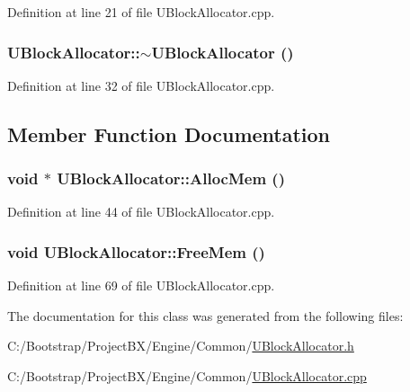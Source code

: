 Definition at line 21 of file UBlockAllocator.cpp.\hypertarget{class_u_block_allocator_572f0a804a5496803aa638168effb723}{
\subsubsection[{$\sim$UBlockAllocator}]{\setlength{\rightskip}{0pt plus 5cm}UBlockAllocator::$\sim$UBlockAllocator ()}}
\label{class_u_block_allocator_572f0a804a5496803aa638168effb723}




Definition at line 32 of file UBlockAllocator.cpp.

\subsection{Member Function Documentation}
\hypertarget{class_u_block_allocator_f8ab7728bc950b0626577cec829e0d4a}{
\subsubsection[{AllocMem}]{\setlength{\rightskip}{0pt plus 5cm}void $\ast$ UBlockAllocator::AllocMem ()}}
\label{class_u_block_allocator_f8ab7728bc950b0626577cec829e0d4a}




Definition at line 44 of file UBlockAllocator.cpp.\hypertarget{class_u_block_allocator_d2d64f33591628e1c5f214cd4f6a31cd}{
\subsubsection[{FreeMem}]{\setlength{\rightskip}{0pt plus 5cm}void UBlockAllocator::FreeMem ()}}
\label{class_u_block_allocator_d2d64f33591628e1c5f214cd4f6a31cd}




Definition at line 69 of file UBlockAllocator.cpp.

The documentation for this class was generated from the following files:\begin{CompactItemize}
\item 
C:/Bootstrap/ProjectBX/Engine/Common/\hyperlink{_u_block_allocator_8h}{UBlockAllocator.h}\item 
C:/Bootstrap/ProjectBX/Engine/Common/\hyperlink{_u_block_allocator_8cpp}{UBlockAllocator.cpp}\end{CompactItemize}
